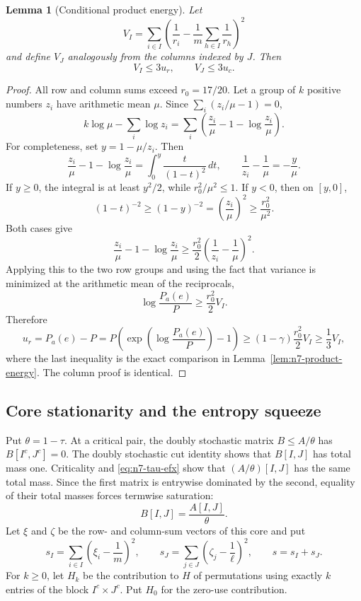 \documentclass[11pt,a4paper]{article}
\numberwithin{equation}{section}
\newtheorem{lemma}[theorem]{Lemma}
\theoremstyle{definition}
\newcommand{\1}{\mathbf{1}}
\begin{document}
\begin{lemma}[Conditional product energy]\label{lem:n7-conditional-energy}
Let
\[
 V_I=\sum_{i\in I}\left(
 \frac1{r_i}-\frac1m\sum_{h\in I}\frac1{r_h}
 \right)^2
\]
and define $V_J$ analogously from the columns indexed by $J$.  Then
\begin{equation}\label{eq:n7-conditional-energy}
 V_I\le3u_r,
 \qquad
 V_J\le3u_c.
\end{equation}
\end{lemma}

\begin{proof}
All row and column sums exceed $r_0=17/20$.  Let a group of $k$ positive
numbers $z_i$ have arithmetic mean $\mu$.  Since
$\sum_i(z_i/\mu-1)=0$,
\[
 k\log\mu-\sum_i\log z_i
 =\sum_i\left(\frac{z_i}{\mu}-1-
       \log\frac{z_i}{\mu}\right).
\]
For completeness, set $y=1-\mu/z_i$.  Then
\[
 \frac{z_i}{\mu}-1-\log\frac{z_i}{\mu}
 =\int_0^y\frac{t}{(1-t)^2}\,dt,
 \qquad
 \frac1{z_i}-\frac1\mu=-\frac{y}{\mu}.
\]
If $y\ge0$, the integral is at least $y^2/2$, while
$r_0^2/\mu^2\le1$.  If $y<0$, then on $[y,0]$,
\[
 (1-t)^{-2}\ge(1-y)^{-2}
 =\left(\frac{z_i}{\mu}\right)^2
 \ge\frac{r_0^2}{\mu^2}.
\]
Both cases give
\begin{equation}\label{eq:n7-group-log-energy}
 \frac{z_i}{\mu}-1-
 \log\frac{z_i}{\mu}
 \ge\frac{r_0^2}{2}
 \left(\frac1{z_i}-\frac1\mu\right)^2.
\end{equation}
Applying this to the two row groups and using the fact that variance is
minimized at the arithmetic mean of the reciprocals,
\[
 \log\frac{P_a(e)}P\ge\frac{r_0^2}{2}V_I.
\]
Therefore
\[
 u_r=P_a(e)-P
 =P\left(\exp\left(\log\frac{P_a(e)}P\right)-1\right)
 \ge(1-\gamma)\frac{r_0^2}{2}V_I\ge\frac13V_I,
\]
where the last inequality is the exact comparison in
Lemma~\ref{lem:n7-product-energy}.  The column proof is identical.
\end{proof}

\subsection{Core stationarity and the entropy squeeze}

Put $\theta=1-\tau$.  At a critical pair, the doubly stochastic matrix
$B\le A/\theta$ has $B[I^c,J^c]=0$.  The doubly stochastic cut identity
shows that $B[I,J]$ has total mass one.  Criticality and
\eqref{eq:n7-tau-efx} show that $(A/\theta)[I,J]$ has the same total mass.
Since the first matrix is entrywise dominated by the second, equality of
their total masses forces termwise saturation:
\begin{equation}\label{eq:n7-core-saturation}
 B[I,J]=\frac{A[I,J]}\theta.
\end{equation}
Let $\xi$ and $\zeta$ be the row- and column-sum vectors of this core and
put
\begin{equation}\label{eq:n7-core-s}
 s_I=\sum_{i\in I}\left(\xi_i-\frac1m\right)^2,
 \qquad
 s_J=\sum_{j\in J}\left(\zeta_j-\frac1\ell\right)^2,
 \qquad
 s=s_I+s_J.
\end{equation}
For $k\ge0$, let $H_k$ be the contribution to $H$ of permutations using
exactly $k$ entries of the block $I^c\times J^c$.  Put $H_0$ for the
zero-use contribution.
\end{document}
